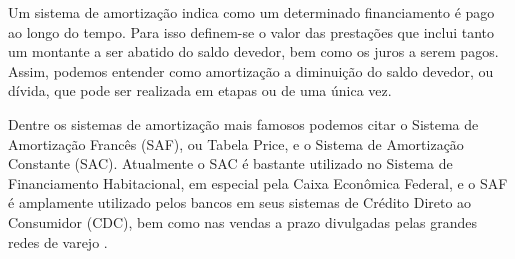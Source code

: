 Um sistema de amortização indica como um determinado financiamento é pago ao longo do tempo. Para isso definem-se o valor das prestações que inclui tanto um montante a ser abatido do saldo devedor, bem como os juros a serem pagos. Assim, podemos entender como amortização a diminuição do saldo devedor, ou dívida, que pode ser realizada em etapas ou de uma única vez.

Dentre os sistemas de amortização mais famosos podemos citar o Sistema de Amortização Francês (SAF), ou Tabela Price, e o Sistema de Amortização Constante (SAC). Atualmente o SAC é bastante utilizado no Sistema de Financiamento Habitacional, em especial pela Caixa Econômica Federal, e o SAF é amplamente utilizado pelos bancos em seus sistemas de Crédito Direto ao Consumidor (CDC), bem como nas vendas a prazo divulgadas pelas grandes redes de varejo \cite{usoSACSAF}.

